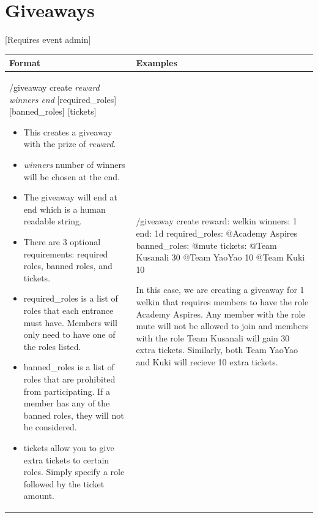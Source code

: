 \documentclass{scrartcl}
\begin{document}
\section{Giveaways} [Requires event admin]
\begin{tabularx}{\textwidth}{|>{\raggedright\arraybackslash}X|>{\raggedright\arraybackslash}X|}
\hline
Format & Examples \\
\hline
/giveaway create \textit{reward winners end} [required\_roles] [banned\_roles] [tickets]
\begin{itemize}
    \item This creates a giveaway with the prize of \textit{reward}. 
    \item \textit{winners} number of winners will be chosen at the end.
    \item The giveaway will end at {end} which is a human readable string.
    \item There are 3 optional requirements: required roles, banned roles, and tickets.
    \item required\_roles is a list of roles that each entrance must have. Members will only need to have one of the roles listed.
    \item banned\_roles is a list of roles that are prohibited from participating. If a member has any of the banned roles, they will not be considered. 
    \item tickets allow you to give extra tickets to certain roles. Simply specify a role followed by the ticket amount. 
\end{itemize}
&
\vspace{0.25cm}
/giveaway create reward: \color{gray}welkin \color{black} winners: \color{gray}1 \color{black}end: \color{gray} 1d \color{black} required\_roles: \color{gray}@Academy Aspires \color{black} banned\_roles: \color{gray} @mute \color{black} tickets: \color{gray} @Team Kusanali 30 @Team YaoYao 10 @Team Kuki 10 \color{black}

\vspace{0.5cm}
In this case, we are creating a giveaway for 1 welkin that requires members to have the role Academy Aspires. Any member with the role mute will not be allowed to join and members with the role Team Kusanali will gain 30 extra tickets. Similarly, both Team YaoYao and Kuki will recieve 10 extra tickets.
    

\end{tabularx}
\end{document}
